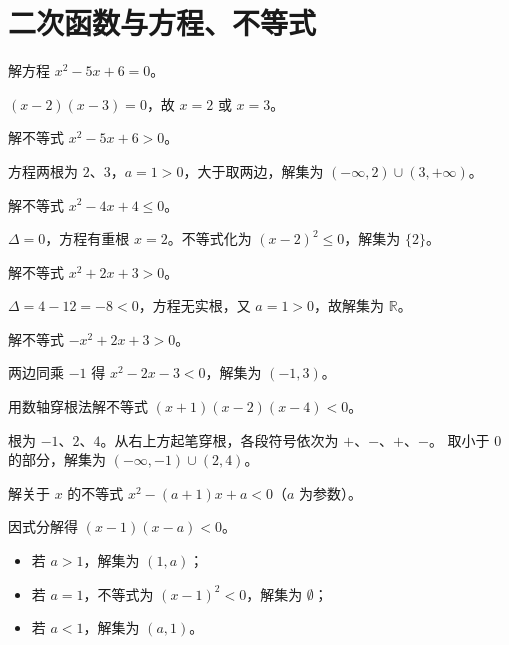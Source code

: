 \section{二次函数与方程、不等式}

\begin{problem}
解方程 $x^2-5x+6=0$。
\end{problem}
\begin{solution}
$(x-2)(x-3)=0$，故 $x=2$ 或 $x=3$。
\end{solution}

\begin{problem}
解不等式 $x^2-5x+6>0$。
\end{problem}
\begin{solution}
方程两根为 $2$、$3$，$a=1>0$，大于取两边，解集为 $(-\infty,2)\cup(3,+\infty)$。
\end{solution}

\begin{problem}
解不等式 $x^2-4x+4\leq0$。
\end{problem}
\begin{solution}
$\Delta=0$，方程有重根 $x=2$。不等式化为 $(x-2)^2\leq0$，解集为 $\{2\}$。
\end{solution}

\begin{problem}
解不等式 $x^2+2x+3>0$。
\end{problem}
\begin{solution}
$\Delta=4-12=-8<0$，方程无实根，又 $a=1>0$，故解集为 $\mathbb{R}$。
\end{solution}

\begin{problem}
解不等式 $-x^2+2x+3>0$。
\end{problem}
\begin{solution}
两边同乘 $-1$ 得 $x^2-2x-3<0$，解集为 $(-1,3)$。
\end{solution}

\begin{problem}
用数轴穿根法解不等式 $(x+1)(x-2)(x-4)<0$。
\end{problem}
\begin{solution}
根为 $-1$、$2$、$4$。从右上方起笔穿根，各段符号依次为 $+$、$-$、$+$、$-$。
取小于 $0$ 的部分，解集为 $(-\infty,-1)\cup(2,4)$。
\end{solution}

\begin{problem}
解关于 $x$ 的不等式 $x^2-(a+1)x+a<0$（$a$ 为参数）。
\end{problem}
\begin{solution}
因式分解得 $(x-1)(x-a)<0$。
\begin{itemize}
  \item 若 $a>1$，解集为 $(1,a)$；
  \item 若 $a=1$，不等式为 $(x-1)^2<0$，解集为 $\emptyset$；
  \item 若 $a<1$，解集为 $(a,1)$。
\end{itemize}
\end{solution}

